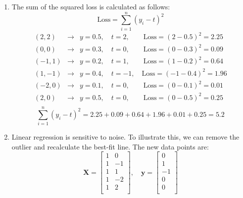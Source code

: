 \documentclass[a4paper,12pt]{article}
\begin{document}
\begin{enumerate}[label=\alph*)]
    \item The sum of the squared loss is calculated as follows:
    \[
\text{Loss} = \sum_{i=1}^{n} (y_i - t)^2
\]
\[
\begin{array}{rcl}
    (2,2)   &\rightarrow& y = 0.5, \quad t = 2,  \quad\quad \text{Loss} = (2 - 0.5)^2 = 2.25 \\
    (0,0)   &\rightarrow& y = 0.3, \quad t = 0,  \quad\quad \text{Loss} = (0 - 0.3)^2 = 0.09 \\
    (-1,1)  &\rightarrow& y = 0.2, \quad t = 1,  \quad\quad \text{Loss} = (1 - 0.2)^2 = 0.64 \\
    (1,-1)  &\rightarrow& y = 0.4, \quad t = -1,      \quad \text{Loss} = (-1 - 0.4)^2 = 1.96 \\
    (-2,0)  &\rightarrow& y = 0.1, \quad t = 0,  \quad\quad \text{Loss} = (0 - 0.1)^2 = 0.01 \\
    (2,0)   &\rightarrow& y = 0.5, \quad t = 0,  \quad\quad \text{Loss} = (0 - 0.5)^2 = 0.25 \\
\end{array}
\]
\[
\sum_{i=1}^{n} (y_i -t)^2 = 2.25 + 0.09 + 0.64 + 1.96 + 0.01 + 0.25 = 5.2
\]

\newpage
    \item Linear regression is sensitive to noise. To illustrate this, we can remove the outlier and recalculate the best-fit line. The new data points are:
    \[
    \mathbf{X} = \begin{bmatrix}
    1 & 0 \\
    1 & -1 \\
    1 & 1 \\
    1 & -2 \\
    1 & 2 \\
    \end{bmatrix}, \quad \mathbf{y} = \begin{bmatrix}
    0 \\
    1 \\
    -1 \\
    0 \\
    0 \\
    \end{bmatrix}
    \]


\end{enumerate}
\end{document}

